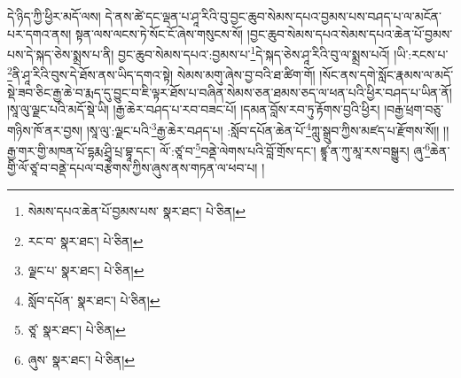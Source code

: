དེ་ཉིད་ཀྱི་ཕྱིར་མདོ་ལས། དེ་ནས་ཚེ་དང་ལྡན་པ་ཤཱ་རིའི་བུ་བྱང་ཆུབ་སེམས་དཔའ་བྱམས་པས་བཤད་པ་ལ་མངོན་པར་དགའ་ནས། སྟན་ལས་ལངས་ཏེ་སོང་ངོ་ཞེས་གསུངས་སོ། །བྱང་ཆུབ་སེམས་དཔའ་སེམས་དཔའ་ཆེན་པོ་བྱམས་པས་དེ་སྐད་ཅེས་སྨྲས་པ་ནི། བྱང་ཆུབ་སེམས་དཔའ་:བྱམས་པ་\footnote{སེམས་དཔའ་ཆེན་པོ་བྱམས་པས་  སྣར་ཐང་།  པེ་ཅིན། }དེ་སྐད་ཅེས་ཤཱ་རིའི་བུ་ལ་སྨྲས་པའོ། །ཡི་:རངས་པ་\footnote{རང་བ་  སྣར་ཐང་།  པེ་ཅིན། }ནི་ཤཱ་རིའི་བུས་དེ་ཐོས་ནས་ཡིད་དགའ་སྟེ། སེམས་མགུ་ཞེས་བྱ་བའི་ཐ་ཚིག་གོ། །སོང་ནས་དགེ་སློང་རྣམས་ལ་མདོ་སྡེ་ཟབ་ཅིང་རྒྱ་ཆེ་བ་རྨད་དུ་བྱུང་བ་ཇི་ལྟར་ཐོས་པ་བཞིན་སེམས་ཅན་ཐམས་ཅད་ལ་ཕན་པའི་ཕྱིར་བཤད་པ་ཡིན་ནོ། །སཱ་ལུ་ལྗང་པའི་མདོ་སྡེ་ཡི། །རྒྱ་ཆེར་བཤད་པ་རབ་བཟང་པོ། །དམན་བློས་རབ་ཏུ་རྟོགས་བྱའི་ཕྱིར། །བརྒྱ་ཕྲག་བཅུ་གཉིས་ཁོ་ནར་བྱས། །སཱ་ལུ་:ལྗང་པའི་\footnote{ལྗང་པ་  སྣར་ཐང་།  པེ་ཅིན། }རྒྱ་ཆེར་བཤད་པ། :སློབ་དཔོན་ཆེན་པོ་\footnote{སློབ་དཔོན་  སྣར་ཐང་།  པེ་ཅིན། }ཀླུ་སྒྲུབ་ཀྱིས་མཛད་པ་རྫོགས་སོ།། །།རྒྱ་གར་གྱི་མཁན་པོ་དྷརྨ་ཤྲཱི་པྲ་བྷཱ་དང་། ལོ་:ཙཱ་བ་\footnote{ཙཱ་  སྣར་ཐང་།  པེ་ཅིན། }བནྡེ་ལེགས་པའི་བློ་གྲོས་དང་། ཛྙཱ་ན་ཀུ་མཱ་རས་བསྒྱུར། ཞུ་\footnote{ཞུས་  སྣར་ཐང་།  པེ་ཅིན། }ཆེན་གྱི་ལོ་ཙཱ་བ་བནྡེ་དཔལ་བརྩེགས་ཀྱིས་ཞུས་ནས་གཏན་ལ་ཕབ་པ། ། 